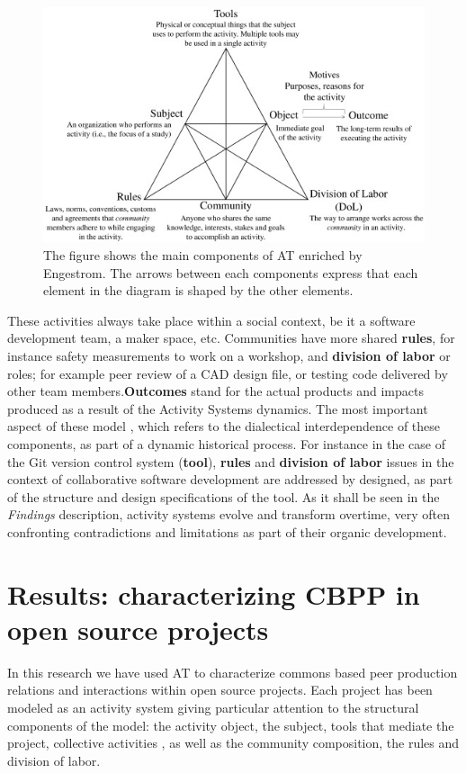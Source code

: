\documentclass{ICED-Paper}%
\begin{document}
\begin{figure}
\includegraphics[width=\linewidth,height=\textheight,keepaspectratio]{AT.jpg}
\caption{\label{fig1}The figure shows the main components of AT enriched by Engestrom\cite{}. The arrows between each components express that each element in the diagram is shaped by the other elements.}
\end{figure}
\bigskip

 These activities always take place within a social context, be it a software development team, a maker space, etc. Communities have more shared \textbf{rules}, for instance safety measurements to work on a workshop, and \textbf{division of labor} or roles; for example peer review of a CAD design file, or testing code delivered by other team members.\textbf{Outcomes} stand for the actual products and impacts produced as a result of the Activity Systems dynamics. The most important aspect of these model , which refers to the dialectical interdependence of these components, as part of a dynamic historical process. For instance in the case of the Git version control system (\textbf{tool}), \textbf{rules} and \textbf{division of labor} issues in the context of collaborative software development are addressed by designed, as part of the structure and design specifications of the tool. As it shall be seen in the \emph{Findings} description, activity systems evolve and transform overtime, very often confronting contradictions and limitations as part of their organic development.

\section{Results: characterizing CBPP in open source projects}
In this research we have used AT to characterize commons based peer production relations and interactions within open source projects. Each project has been modeled as an activity system giving particular attention to the structural components of the model: the activity object, the subject, tools that mediate the project, collective activities , as well as the community composition, the rules and division of labor.
\end{document}
